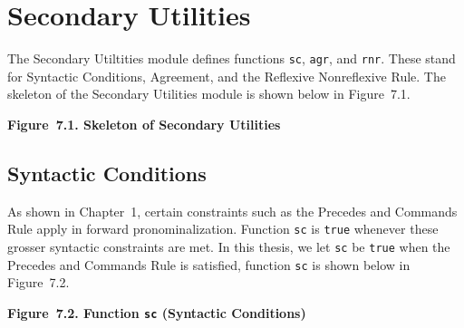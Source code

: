 \documentclass{article}
\begin{document}
%
%

\section{Secondary Utilities}

The Secondary Utiltities module defines functions \texttt{sc},
\texttt{agr}, and \texttt{rnr}. These stand for Syntactic
Conditions, Agreement, and the Reflexive Nonreflexive Rule. The
skeleton of the Secondary Utilities module is shown below in
Figure~7.1.

\bigbreak
\begin{minipage}{\textwidth}
\vbox{}
\bigbreak
{}
\textbf{Figure~7.1. Skeleton of Secondary Utilities}
\end{minipage}
\bigbreak


\subsection{Syntactic Conditions}

As shown in Chapter~1, certain constraints such as the Precedes
and Commands Rule apply in forward pronominalization.  Function
\texttt{sc} is \texttt{true} whenever these grosser syntactic
constraints are met. In this thesis, we let \texttt{sc} be
\texttt{true} when the Precedes and Commands Rule is satisfied,
function \texttt{sc} is shown below in Figure~7.2.

\bigbreak
\begin{minipage}{\textwidth}
\vbox{}
\bigbreak
{}
\textbf{Figure~7.2. Function \texttt{sc} (Syntactic Conditions)}
\end{minipage}
\bigbreak

\end{document}
